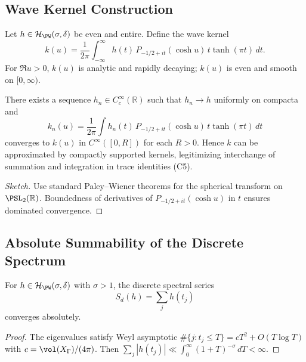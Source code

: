 \subsection{Wave Kernel Construction}\relax\hspace{0pt}
\label{subsec:wave-kernel}\relax\hspace{0pt}

Let $h\in\mathcal{H}_{\PW}(\sigma,\delta)$ be even and entire. Define the wave kernel
\[
k(u)=\frac{1}{2\pi}\int_{-\infty}^\infty h(t)\,P_{-1/2+it}(\cosh u)\,t\tanh(\pi t)\,dt.
\]
For $\Re u>0$, $k(u)$ is analytic and rapidly decaying; $k(u)$ is even and smooth on $[0,\infty)$. %

\begin{lemma}\label{lem:wave-approx}\relax
There exists a sequence $h_n\in C_c^\infty(\mathbb{R})$ such that $h_n\to h$ uniformly on compacta and
\[
k_n(u)=\frac{1}{2\pi}\int h_n(t)\,P_{-1/2+it}(\cosh u)\,t\tanh(\pi t)\,dt
\]
converges to $k(u)$ in $C^\infty([0,R])$ for each $R>0$.  
Hence $k$ can be approximated by compactly supported kernels, legitimizing interchange of summation and integration in trace identities (C5). %
\end{lemma}

\begin{proof}[Sketch]\relax
Use standard Paley–Wiener theorems for the spherical transform on $\PSL_2(\mathbb{R})$.  
Boundedness of derivatives of $P_{-1/2+it}(\cosh u)$ in $t$ ensures dominated convergence. %
\end{proof}

\subsection{Absolute Summability of the Discrete Spectrum}\relax\hspace{0pt}
\label{subsec:abs-sum}\relax\hspace{0pt}

\begin{theorem}\label{thm:abs-sum}\relax
For $h\in\mathcal{H}_{\PW}(\sigma,\delta)$ with $\sigma>1$, the discrete spectral series
\[
S_d(h)=\sum_j h(t_j)
\]
converges absolutely. %
\end{theorem}

\begin{proof}\relax
The eigenvalues satisfy Weyl asymptotic $\#\{j:t_j\le T\}=cT^2+O(T\log T)$ with $c=\vol(X_\Gamma)/(4\pi)$.  
Then $\sum_j |h(t_j)|\ll \int_0^\infty (1+T)^{-\sigma}\,dT<\infty$. %
\end{proof}

